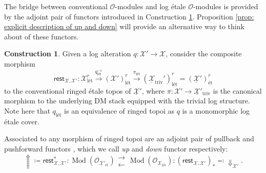 \documentclass[11pt]{amsart}
\theoremstyle{definition}
\theoremstyle{definition}
\newtheorem{construction}[theorem]{Construction}
\newcommand{\cX}{\mathcal{X}}
\newcommand{\LogO}[1]{\mathcal{O}_{{#1}_\text{l\'et}}}
\newcommand{\ul}[1]{\underline{#1}}
\newcommand{\cal}{\mathcal}
\def\cX{{\cal X}}
\newcommand{\rt}[1]{{#1}_{\text{l\'et}}^r}
\newcommand{\longleftrightarrows}{\mathrel{\substack{\textstyle\longrightarrow \\[-0.3ex] \textstyle\longleftarrow}}}
\begin{document}
The bridge between conventional $\mathcal{O}$-modules and log \'etale $\mathcal{O}$-modules is provided by the adjoint pair of functors introduced in Construction \ref{construction: up and down}. Proposition \ref{prop: explicit description of up and down} will provide an alternative way to think about of these functors.
\begin{construction}\label{construction: up and down}
Given a log alteration $q\colon \mathcal{X'}\rightarrow \mathcal{X}$, consider the composite morphism
$$\mathsf{rest}_{\cX,\cX'}\colon \rt{\cX}\xrightarrow{q_{\text{l\'et}}^{-1}} \rt{(\cX')} \xrightarrow{\pi_{\text{l\'et}}} \rt{(\ul{\cX}_{\text{triv}}')} = (\ul{\cX}')_{\text{\'et}}^r$$
to the conventional ringed \'etale topos of $\ul{\cX}'$, where $\pi\colon \cX'\rightarrow \ul{\cX}'_{\text{triv}}$ is the canonical morphism to the underlying DM stack equipped with the trivial log structure. Note here that $q_{\text{l\'et}}$ is an equivalence of ringed topoi as $q$ is a monomorphic log \'etale cover.

Associated to any morphism of ringed topoi are an adjoint pair of pullback and pushforward functors \cite[03D5]{stacks}, which we call \textit{up} and \textit{down} functor respectively:
$$\Uparrow \coloneqq \mathsf{rest}_{\cX,\cX'}^*\colon \operatorname{Mod}(\mathcal{O}_{\underline{\cX}'_\text{\'et}})\longleftrightarrows \operatorname{Mod}(\LogO{\cX})\colon (\mathsf{rest}_{\cX,\cX'})_* \eqqcolon \Downarrow_{\cX'}.$$




\end{construction}
\end{document}
